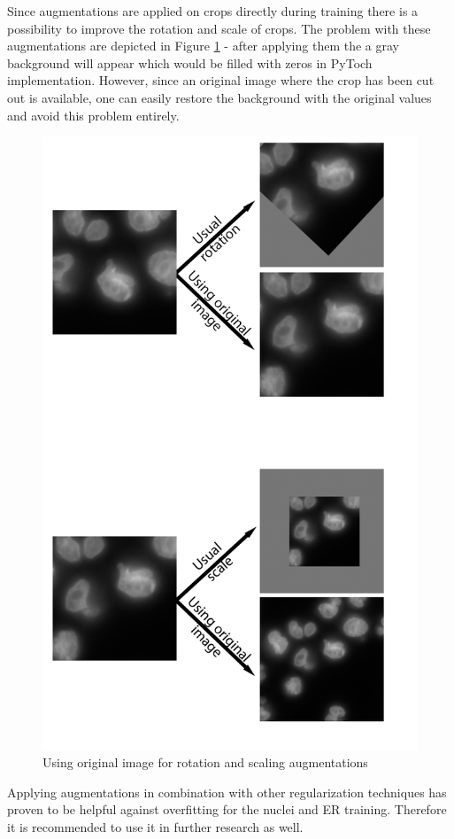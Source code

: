 Since augmentations are applied on crops directly during training there is a possibility to improve the rotation and scale of crops. The problem with these augmentations are depicted in Figure \ref{fig:smart-augments} - after applying them the a gray background will appear which would be filled with zeros in PyToch implementation. However, since an original image where the crop has been cut out is available, one can easily restore the background with the original values and avoid this problem entirely.

\begin{figure}[H]
	\begin{center}
		\includegraphics[width=0.7\linewidth]{bilder/model training/smart augmentations.png}
		\caption{Using original image for rotation and scaling augmentations}\label{fig:smart-augments}
	\end{center}
\end{figure}

Applying augmentations in combination with other regularization techniques has proven to be helpful against overfitting for the nuclei and ER training. Therefore it is recommended to use it in further research as well.
